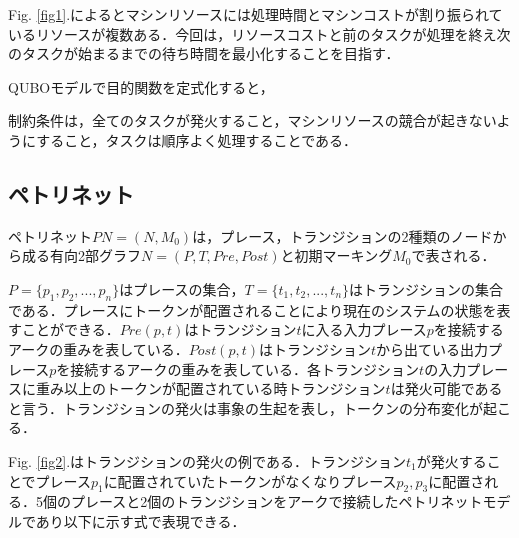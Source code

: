 \documentclass[conference]{IEEEtran}
\begin{document}
Fig. \ref{fig1}.によるとマシンリソースには処理時間とマシンコストが割り振られているリソースが複数ある．今回は，リソースコストと前のタスクが処理を終え次のタスクが始まるまでの待ち時間を最小化することを目指す．

QUBOモデルで目的関数を定式化すると，

制約条件は，全てのタスクが発火すること，マシンリソースの競合が起きないようにすること，タスクは順序よく処理することである．


\subsection{ペトリネット}
ペトリネット$PN = (N,M_0)$は，プレース，トランジションの2種類のノードから成る有向2部グラフ$N = (P,T,Pre,Post)$と初期マーキング$M_0$で表される．\cite{b2}

$P = \{p_1,p_2,...,p_n\}$はプレースの集合，$T = \{t_1,t_2,...,t_n\}$はトランジションの集合である．プレースにトークンが配置されることにより現在のシステムの状態を表すことができる．$Pre(p,t)$はトランジション$t$に入る入力プレース$p$を接続するアークの重みを表している．$Post(p,t)$はトランジション$t$から出ている出力プレース$p$を接続するアークの重みを表している．各トランジション$t$の入力プレースに重み以上のトークンが配置されている時トランジション$t$は発火可能であると言う．トランジションの発火は事象の生起を表し，トークンの分布変化が起こる．

Fig. \ref{fig2}.はトランジションの発火の例である．トランジション$t_1$が発火することでプレース$p_1$に配置されていたトークンがなくなりプレース$p_2,p_3$に配置される．5個のプレースと2個のトランジションをアークで接続したペトリネットモデルであり以下に示す式で表現できる．
\end{document}
